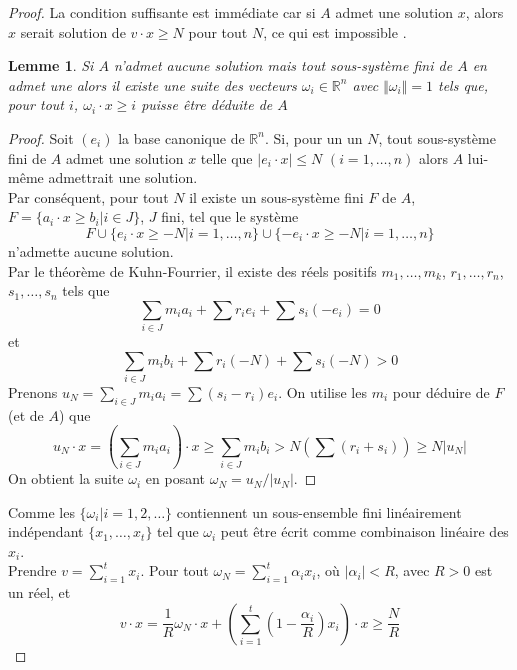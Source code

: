 \documentclass[11pt]{report}
\newenvironment{boxtheorem}
{\begin{tcolorbox}
		[enhanced jigsaw,breakable,pad at break*=2mm,
		colback=black!5,colframe=bleueLeger]}
	{\end{tcolorbox}}
\theoremstyle{styletheorem}
\newtheorem{lemma}[theoreme]{Lemme}
\theoremstyle{styledef}
\theoremstyle{remark}
\newenvironment{lemme}
{\vspace*{0.3cm}\begin{boxtheorem}\begin{lemma}}{\end{lemma}\end{boxtheorem}\vspace*{0.3cm}}
\newcommand{\R}{\ensuremath{\mathbb{R}}}
\begin{document}
\begin{proof}
	La condition suffisante est immédiate  car si $A$ admet une solution $x$, alors $x$ serait solution de  $v \cdot x \geq N$ pour tout $N$, ce qui est impossible \cite{b16}.\\
	\begin{lemme}
		Si $A$ n'admet aucune solution mais tout sous-système fini de $A$ en admet une alors il existe une suite des vecteurs $\omega_i \in \R^n$ avec $\Vert \omega_i \Vert =1$ tels que, pour tout $i$, $\omega_i \cdot x\geq i$ puisse être déduite de $A$ 
	\end{lemme}
	\begin{proof}
		Soit $(e_i)$ la base canonique de $\R^n$. Si, pour un un $N$, tout sous-système fini de $A$ admet une solution $x$ telle que $\vert e_i \cdot x\vert \leq N$ $(i=1,\dots, n)$ alors $A$ lui-même admettrait une solution. \\
		
		Par conséquent, pour tout $N$ il existe un sous-système fini $F$ de $A$, $F =\lbrace a_i\cdot x \geq b_i\vert i \in J \rbrace$, $J$ fini, tel que le système $$F \cup \lbrace e_i \cdot x \geq -N\vert i=1,\dots,n\rbrace \cup \lbrace -e_i \cdot x \geq -N\vert i=1,\dots,n\rbrace$$ n'admette aucune solution.\\
		Par le théorème de Kuhn-Fourrier, il existe des réels positifs $m_1,\dots,m_k$, $r_1,\dots, r_n$, $s_1,\dots, s_n$ tels que 
		\begin{equation}\label{eqic1}
			\sum_{i \in J} m_i a_i + \sum r_i e_i + \sum s_i (-e_i) = 0
		\end{equation}
		et 
		\begin{equation}\label{eqic2}
			\sum_{i \in J} m_i b_i + \sum r_i (-N) + \sum s_i (-N) >0
		\end{equation}
		Prenons $u_N = \sum_{i \in J} m_i a_i = \sum (s_i -r_i)e_i$. On utilise les $m_i$ pour déduire de $F$ (et de $A$) que $$u_N \cdot x = \left( \sum_{i \in J} m_ia_i\right) \cdot x \geq \sum_{i \in J} m_i b_i > N \left( \sum (r_i+ s_i)\right) \geq N \vert u_N\vert$$
		On obtient la suite $\omega_i$ en posant $\omega_N = u_N / \lvert u_N\rvert$.
	\end{proof}
	Comme les $\lbrace \omega_i \vert i=1,2,\dots \rbrace$ contiennent un sous-ensemble fini linéairement indépendant  $\lbrace x_1,\dots, x_t\rbrace$ tel que $\omega_i$ peut être écrit comme combinaison linéaire des $x_i$.\\
	Prendre $v=\sum_{i=1}^t x_i$. Pour tout $\omega_N =\sum_{i=1}^t \alpha_i x_i$, où $\lvert \alpha_i \rvert < R$, avec $R>0$ est un réel,  et $$v \cdot x = \frac{1}{R} \omega_N \cdot x + \left( \sum_{i=1}^t (1-\frac{\alpha_i}{R})x_i\right) \cdot x \geq \frac{N}{R}$$
	
\end{proof}
\end{document}
